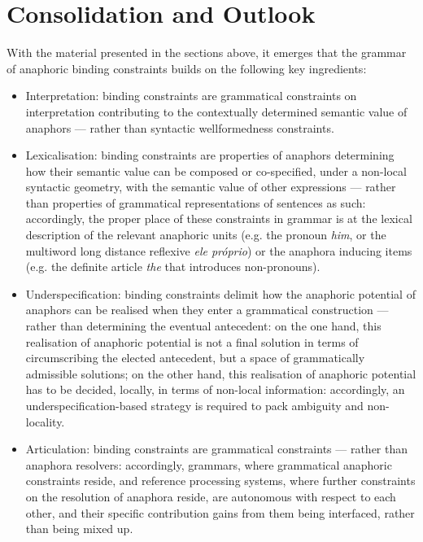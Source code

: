\documentclass[output=paper
	        ,collection
	        ,collectionchapter
 	        ,biblatex
                ,babelshorthands
                ,newtxmath
                ,draftmode
                ,colorlinks, citecolor=brown
]{langscibook}
\begin{document}
\section{Consolidation and Outlook \label{outlook}}


With the material presented in the sections above, it emerges that the grammar 
of anaphoric binding constraints builds on the following key ingredients:


\begin{itemize}

\item Interpretation: binding constraints are grammatical constraints on interpretation 
contributing to the contextually determined
semantic value of anaphors --- rather than syntactic wellformedness constraints.

\item Lexicalisation: binding constraints are properties of 
anaphors determining how their semantic value 
can be composed or co-specified, under a non-local syntactic geometry, with the
semantic value of other expressions --- rather than properties of grammatical
representations of sentences as such: accordingly, the
proper place of these constraints in grammar is at the lexical description of 
the relevant anaphoric units (e.g. the  pronoun {\em him}, or the  multiword long distance reflexive {\em ele pr\'{o}prio}) or the anaphora inducing items (e.g. the  definite article {\em the} that introduces non-pronouns).

\item Underspecification: binding constraints delimit how the
anaphoric potential of anaphors can be realised when they
enter a grammatical construction --- rather than determining the eventual antecedent: 
on the one hand, this realisation of anaphoric potential is not a final solution in terms of circumscribing
the elected antecedent, but a space of grammatically admissible solutions;
on the other hand, this realisation of anaphoric potential has to be decided, locally,
in terms of non-local information: accordingly, an underspecification-based
strategy is required to pack ambiguity and non-locality.

\item Articulation: binding constraints are grammatical constraints --- rather than 
anaphora resolvers: accordingly, grammars, where grammatical ana\-phoric
constraints reside, and reference processing systems, where further
constraints on the resolution of anaphora reside,
are autonomous with respect to each other, and their specific contribution gains
from them being interfaced, rather than being mixed up.
\end{itemize}
\end{document}
